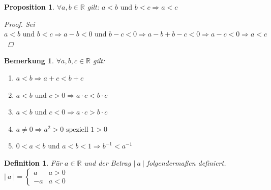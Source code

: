 \documentclass[a4paper,titlepage,oneside]{article}
\def\R{\ensuremath{\mathbb{R}} }
\def\fa{\ensuremath{\forall}}
\newcommand{\abs}[1]{\ensuremath{\left|\:#1\:\right|}}
\theoremstyle{thmstyle}
\theoremstyle{subthmstyle}
\newtheorem{subprop}[subsatz]{Proposition}
\newtheorem{subdefi}[subsatz]{Definition}
\newtheorem{subbem}[subsatz]{Bemerkung}
\begin{document}
\begin{subprop}
\(\fa a, b \in \R \) gilt: \(a < b \text{ und } b < c \Rightarrow a < c\)
\begin{proof}
Sei \( a < b \text{ und } b < c \Rightarrow a - b < 0  \text{ und } b - c < 0 \Rightarrow a - b + b - c < 0 \Rightarrow a - c < 0 \Rightarrow a < c\)
\end{proof}
\end{subprop}

\begin{subbem}
\(\fa a, b, c \in \R\) gilt:
\begin{enumerate}[label=\alph*)]
	\item \(a < b \Rightarrow a + c < b + c\)
	\item \(a < b \text{ und } c > 0 \Rightarrow a \cdot c < b \cdot c\)
	\item \(a < b \text{ und } c < 0 \Rightarrow a \cdot c > b \cdot c\)
	\item \(a \ne 0 \Rightarrow a^2 > 0 \text{ speziell } 1 > 0\)
	\item \(0 < a < b \text{ und } a < b < 1 \Rightarrow b^{-1} < a^{-1}\)
\end{enumerate}
\end{subbem}

\begin{subdefi}
Für \(a \in \R\) und der Betrag \abs{a} folgendermaßen definiert.
$\abs{a} = \begin{cases}
		 a 	& a > 0\\
		-a 	& a < 0  \end{cases}$
\end{subdefi}
\end{document}
